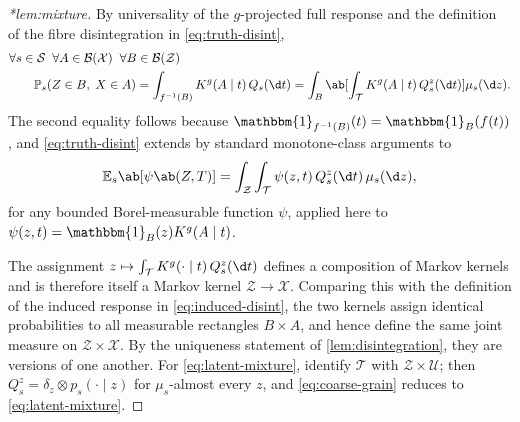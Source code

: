 \documentclass[12pt]{article}
\newcommand{\E}{\mathbb{E}}
\newcommand{\Prb}{\mathbb{P}}
\newcommand{\Gens}{\mathcal{S}}
\newcommand{\Borel}{\mathcal{B}}
\newcommand{\1}{\mathbbm{1}}
\renewcommand{\[}{\begin{equation}}
\renewcommand{\]}{\end{equation}}
\begin{document}
\begin{proof}[*lem:mixture]
        By universality of the \(g\)-projected full response and the definition of the fibre disintegration in \cref{eq:truth-disint},
        \[
            \begin{split}
                &\forall s\in\Gens\;\;\forall A \in \Borel( \mathcal X ) \;\; \forall B \in \Borel (\mathcal Z ) \\
                &\qquad \Prb_s( Z\in B, \;X\in A) = \int_{f^{-1}(B)} K^g (A \mid t) \, Q_s(\d t) = \int_B \ab[ \int_{\mathcal T} K^g (A \mid t ) \, Q_s^{z} (\d t)] \mu_s(\d z).
            \end{split}
        \]
        The second equality follows because \(\1_{f^{-1}(B)}(t) = \1_B(f(t))\), and \cref{eq:truth-disint} extends by standard monotone-class arguments to
        \[
            \E_s \ab[ \psi \ab (Z, T) ] = \int_{\mathcal{Z}} \int_{ \mathcal T } \psi(z, t) \, Q_s^z(\d t) \, \mu_s(\d z),
        \]
        for any bounded Borel-measurable function \(\psi\), applied here to \( \psi( z, t) = \1_B(z) K^g(A \mid t)\).
        
        The assignment \(z \mapsto \int_{\mathcal{T}} K^g(\cdot \mid t) \, Q_s^z( \d t ) \) defines a composition of Markov kernels and is therefore itself a Markov kernel \(\mathcal Z \to \mathcal X\).
        Comparing this with the definition of the induced response in \cref{eq:induced-disint}, the two kernels assign identical probabilities to all measurable rectangles \(B \times A\), and hence define the same joint measure on \(\mathcal{Z} \times \mathcal{X}\).
        By the uniqueness statement of \cref{lem:disintegration}, they are versions of one another.
        For \cref{eq:latent-mixture}, identify \(\mathcal T\) with \(\mathcal Z\times\mathcal U\); then \(Q_s^{z}=\delta_z\otimes p_s(\cdot\mid z)\) for \(\mu_s\)-almost every \(z\), and \cref{eq:coarse-grain} reduces to \cref{eq:latent-mixture}.
    \end{proof}
\end{document}
